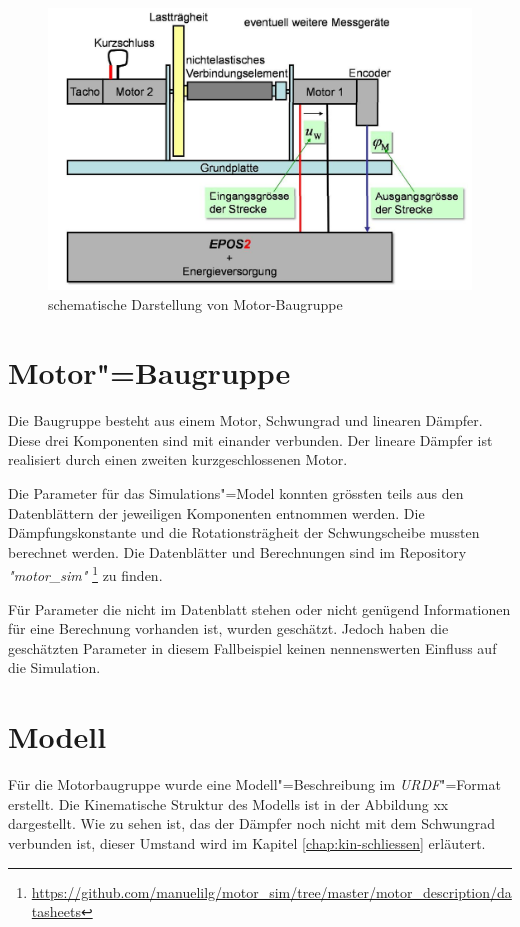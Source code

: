 \begin{figure}[ht!]
	\centering
	\includegraphics[width=14.5cm]{images/motor_baugruppe.png} %
	\caption{schematische Darstellung von Motor-Baugruppe}
	\label{Ab:motor-baugruppe}
\end{figure}

\section{Motor"=Baugruppe}
Die Baugruppe besteht aus einem Motor, Schwungrad und linearen Dämpfer.
Diese drei Komponenten sind mit einander verbunden.
Der lineare Dämpfer ist realisiert durch einen zweiten kurzgeschlossenen Motor.

Die Parameter für das Simulations"=Model konnten grössten teils aus den Datenblättern der jeweiligen Komponenten entnommen werden. 
Die Dämpfungskonstante und die Rotationsträgheit der Schwungscheibe mussten berechnet werden.
Die Datenblätter und Berechnungen sind im Repository \textit{\textsc{"}motor\_sim\textit{"}} \footnote{\url{https://github.com/manuelilg/motor\_sim/tree/master/motor\_description/datasheets}} zu finden. 

Für Parameter die nicht im Datenblatt stehen oder nicht genügend Informationen für eine Berechnung vorhanden ist, wurden geschätzt.
Jedoch haben die geschätzten Parameter in diesem Fallbeispiel keinen nennenswerten Einfluss auf die Simulation.


\section{Modell}
Für die Motorbaugruppe wurde eine Modell"=Beschreibung im \textit{URDF}"=Format erstellt.
Die Kinematische Struktur des Modells ist in der Abbildung xx dargestellt.
Wie zu sehen ist, das der Dämpfer noch nicht mit dem Schwungrad verbunden ist, dieser Umstand wird im Kapitel \ref{chap:kin-schliessen} erläutert.

